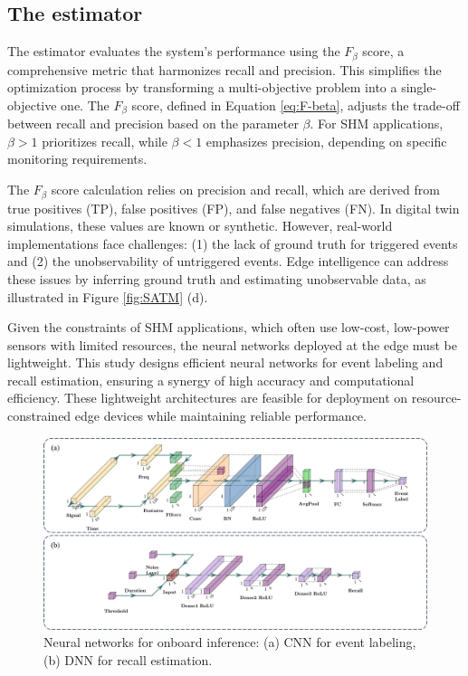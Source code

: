 \documentclass[a4paper,fleqn,numbers,sort&compress]{cas-sc}
\begin{document}
\subsection{The estimator}
\label{component-estimator}

The estimator evaluates the system's performance using the $F_{\beta}$ score, a comprehensive metric that harmonizes recall and precision. This simplifies the optimization process by transforming a multi-objective problem into a single-objective one. The $F_{\beta}$ score, defined in Equation \ref{eq:F-beta}, adjusts the trade-off between recall and precision based on the parameter $\beta$. For SHM applications, $\beta > 1$ prioritizes recall, while $\beta < 1$ emphasizes precision, depending on specific monitoring requirements.

The $F_{\beta}$ score calculation relies on precision and recall, which are derived from true positives (TP), false positives (FP), and false negatives (FN). In digital twin simulations, these values are known or synthetic. However, real-world implementations face challenges: (1) the lack of ground truth for triggered events and (2) the unobservability of untriggered events. Edge intelligence can address these issues by inferring ground truth and estimating unobservable data, as illustrated in Figure \ref{fig:SATM} (d).

Given the constraints of SHM applications, which often use low-cost, low-power sensors with limited resources, the neural networks deployed at the edge must be lightweight. This study designs efficient neural networks for event labeling and recall estimation, ensuring a synergy of high accuracy and computational efficiency. These lightweight architectures are feasible for deployment on resource-constrained edge devices while maintaining reliable performance.

\begin{figure}[htbp]
    \centering
    \includegraphics[width=\linewidth]{Fig6.jpg}
    \caption{Neural networks for onboard inference: (a) CNN for event labeling, (b) DNN for recall estimation.}
    \label{fig:Onboard NN}
\end{figure}
\end{document}
